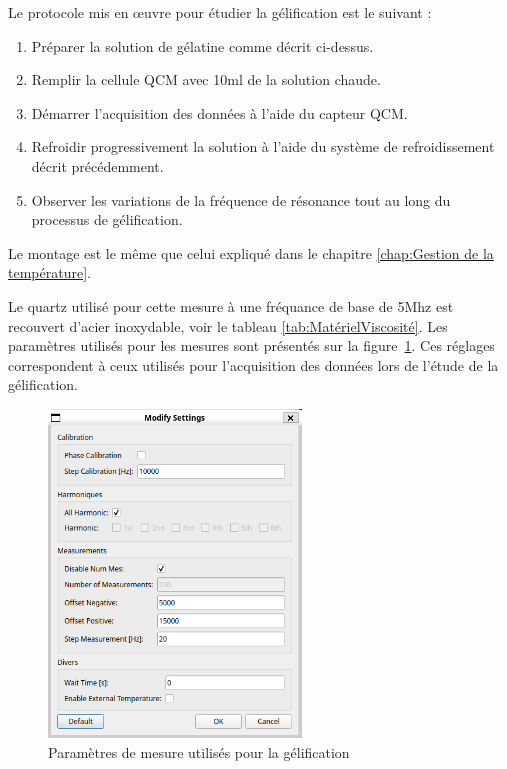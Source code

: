 Le protocole mis en œuvre pour étudier la gélification est le suivant :
\begin{enumerate}
    \item Préparer la solution de gélatine comme décrit ci-dessus.
    \item Remplir la cellule QCM avec 10ml de la solution chaude.
    \item Démarrer l’acquisition des données à l’aide du capteur QCM.
    \item Refroidir progressivement la solution à l’aide du système de refroidissement décrit précédemment.
    \item Observer les variations de la fréquence de résonance tout au long du processus de gélification.
\end{enumerate}
Le montage est le même que celui expliqué dans le chapitre \ref{chap:Gestion de la température}.

Le quartz utilisé pour cette mesure à une fréquance de base de 5Mhz est recouvert d'acier inoxydable, voir le tableau \ref{tab:MatérielViscosité}.
\newpage
Les paramètres utilisés pour les mesures sont présentés sur la figure~\ref{fig:SettingsGelification}. Ces réglages correspondent à ceux utilisés pour l'acquisition des données lors de l'étude de la gélification.

\begin{figure}[H]
    \centering
    \includegraphics[width=0.6\textwidth]{assets/figures/SettingsWater-Ethanol.png}
    \caption{Paramètres de mesure utilisés pour la gélification}
    \label{fig:SettingsGelification}
\end{figure}
\newpage
